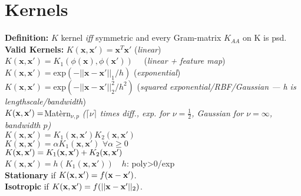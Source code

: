 \section{Kernels}
\textbf{Definition:} $K$ kernel \emph{iff} symmetric and every Gram-matrix $K_{AA}$ on K is psd.\\
\textbf{Valid Kernels:}
$K(\mathbf{x},\mathbf{x'}){=}\mathbf{x}^T\mathbf{x'}$ (\emph{linear})\\
$K(\mathbf{x},\mathbf{x'}){=}K_1(\phi(\mathbf{x}), \phi(\mathbf{x'}))\quad$ (\emph{linear + feature map})\\
$K(\mathbf{x},\mathbf{x'}){=}\mathrm{exp}(-||\mathbf{x}{-}\mathbf{x'}||_1/h)$ (\emph{exponential})\\
$K(\mathbf{x},\mathbf{x'}){=}\mathrm{exp}(-||\mathbf{x}{-}\mathbf{x'}||_2^2/h^2)$ (\emph{squared exponential/RBF/Gaussian --- h is lengthscale/bandwidth})\\
$K({\mathbf{x}}, {\mathbf{x}}') = $Mat\`{e}rn$_{\nu,p}$ \emph{($\lceil\nu\rceil$ times diff., exp. for $\nu=\frac{1}{2}$, Gaussian for $\nu=\infty$, bandwidth $p$)}\\
$K(\mathbf{x}, \mathbf{x'})=K_1(\mathbf{x}, \mathbf{x'})K_2(\mathbf{x}, \mathbf{x'})$\\
$K(\mathbf{x},\mathbf{x'})=\alpha K_1(\mathbf{x}, \mathbf{x'})\,\,\forall \alpha\geq0$\\
$K({\mathbf{x}}, {\mathbf{x}}') = K_1({\mathbf{x}}, {\mathbf{x}}') + K_2({\mathbf{x}}, {\mathbf{x}}')$\\
$K(\mathbf{x},\mathbf{x'}){=}h(K_1(\mathbf{x}, \mathbf{x'}))\quad h$: poly>0/exp\\
\textbf{Stationary} if $K({\mathbf{x}},{\mathbf{x}}') = f({\mathbf{x}} - {\mathbf{x}}')$.\\
\textbf{Isotropic} if $K({\mathbf{x}},{\mathbf{x}}') = f(||{\mathbf{x}} - {\mathbf{x}}'||_2)$.